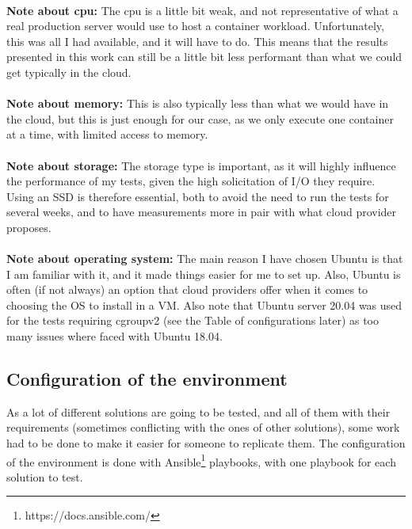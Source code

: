 \paragraph{}\textbf{Note about cpu:}  The cpu is a little bit weak, and not representative of what a real production server would use to host a container workload.  Unfortunately, this was all I had available, and it will have to do.  This means that the results presented in this work can still be a little bit less performant than what we could get typically in the cloud.
\paragraph{}\textbf{Note about memory:}  This is also typically less than what we would have in the cloud, but this is just enough for our case, as we only execute one container at a time, with limited access to memory.
\paragraph{}\textbf{Note about storage:}  The storage type is important, as it will highly influence the performance of my tests, given the high solicitation of I/O they require.  Using an SSD is therefore essential, both to avoid the need to run the tests for several weeks, and to have measurements more in pair with what cloud provider proposes.
\paragraph{}\textbf{Note about operating system:}  The main reason I have chosen Ubuntu is that I am familiar with it, and it made things easier for me to set up.  Also, Ubuntu is often (if not always) an option that cloud providers offer when it comes to choosing the OS to install in a VM.  Also note that Ubuntu server 20.04 was used for the tests requiring cgroupv2 (see the Table of configurations later) as too many issues where faced with Ubuntu 18.04.

\subsection{Configuration of the environment}
As a lot of different solutions are going to be tested, and all of them with their requirements (sometimes conflicting with the ones of other solutions), some work had to be done to make it easier for someone to replicate them.  The configuration of the environment is done with Ansible\footnote{https://docs.ansible.com/} playbooks, with one playbook for each solution to test.

